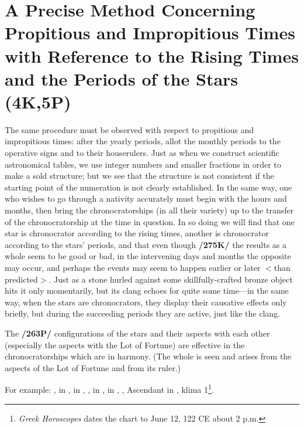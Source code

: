 \section{A Precise Method Concerning Propitious and Impropitious Times with Reference to the Rising Times and the Periods of the Stars (4K,5P)}

The same procedure must be observed with respect to propitious and impropitious times: after the yearly periods, allot the monthly periods to the operative signs and to their houserulers. Just as when we construct scientific astronomical tables, we use integer numbers and smaller fractions in order to make a sold structure; but we see that the structure is not consistent if the starting point of the numeration is not
clearly established. In the same way, one who wishes to go through a nativity accurately must begin with the hours and months, then bring the chronocratorships (in all their variety) up to the transfer of the
chronocratorship at the time in question. In so doing we will find that one star is chronocrator according to the rising times, another is chronocrator according to the stars’ periods, and that even though \textbf{/275K/} the results as a whole seem to be good or bad, in the intervening days and months the opposite may occur, and perhaps the events may seem to happen earlier or later $<$than predicted$>$. Just as a stone hurled against some skillfully-crafted bronze object hits it only momentarily, but its clang echoes for quite some time—in the same way, when the stars are chronocrators, they display their causative effects only briefly, but during the succeeding periods they are active, just like the clang. 

The \textbf{/263P/} configurations of the stars and their aspects with each other (especially the aspects with the Lot of Fortune) are effective in the chronocratorships which are in harmony. (The whole is seen and arises from the aspects of the Lot of Fortune and from its ruler.)

\newpage
For example: \Sun, \Mercury\xspace in \Gemini, \Moon\xspace in \Aquarius, \Saturn, \Venus\xspace in \Leo, \Jupiter\xspace in
\Sagittarius, \Mars, Ascendant in \Libra, klima 1\footnote{\textit{Greek Horoscopes} dates the chart to June 12, 122 CE about 2 p.m.}. 


